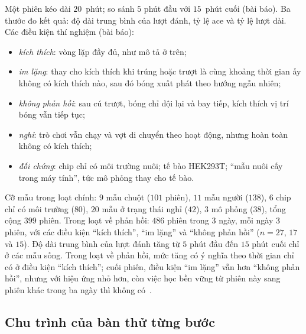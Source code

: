 Một phiên kéo dài $20$~phút; so sánh $5$ phút đầu với $15$~phút cuối (bài báo). Ba thước đo kết quả: độ dài trung bình của lượt đánh, tỷ lệ ace và tỷ lệ lượt dài. Các điều kiện thí nghiệm (bài báo):
\begin{itemize}
\item \emph{kích thích}: vòng lặp đầy đủ, như mô tả ở trên;
\item \emph{im lặng}: thay cho kích thích khi trúng hoặc trượt là cùng khoảng thời gian ấy không có kích thích nào, sau đó bóng xuất phát theo hướng ngẫu nhiên;
\item \emph{không phản hồi}: sau cú trượt, bóng chỉ dội lại và bay tiếp, kích thích vị trí bóng vẫn tiếp tục;
\item \emph{nghỉ}: trò chơi vẫn chạy và vợt di chuyển theo hoạt động, nhưng hoàn toàn không có kích thích;
\item \emph{đối chứng}: chip chỉ có môi trường nuôi; tế bào HEK293T; ``mẫu nuôi cấy trong máy tính'', tức mô phỏng thay cho tế bào.
\end{itemize}
Cỡ mẫu trong loạt chính: $9$ mẫu chuột ($101$ phiên), $11$ mẫu người ($138$), $6$ chip chỉ có môi trường ($80$), $20$ mẫu ở trạng thái nghỉ ($42$), $3$ mô phỏng ($38$), tổng cộng $399$ phiên. Trong loạt về phản hồi: $486$ phiên trong $3$ ngày, mỗi ngày $3$ phiên, với các điều kiện ``kích thích'', ``im lặng'' và ``không phản hồi'' ($n=27$, $17$ và $15$). Độ dài trung bình của lượt đánh tăng từ $5$ phút đầu đến $15$ phút cuối chỉ ở các mẫu sống. Trong loạt về phản hồi, mức tăng có ý nghĩa theo thời gian chỉ có ở điều kiện ``kích thích''; cuối phiên, điều kiện ``im lặng'' vẫn hơn ``không phản hồi'', nhưng với hiệu ứng nhỏ hơn, còn việc học bền vững từ phiên này sang phiên khác trong ba ngày thì không có~\cite{Kagan2022}.

\subsection*{Chu trình của bàn thử từng bước}

